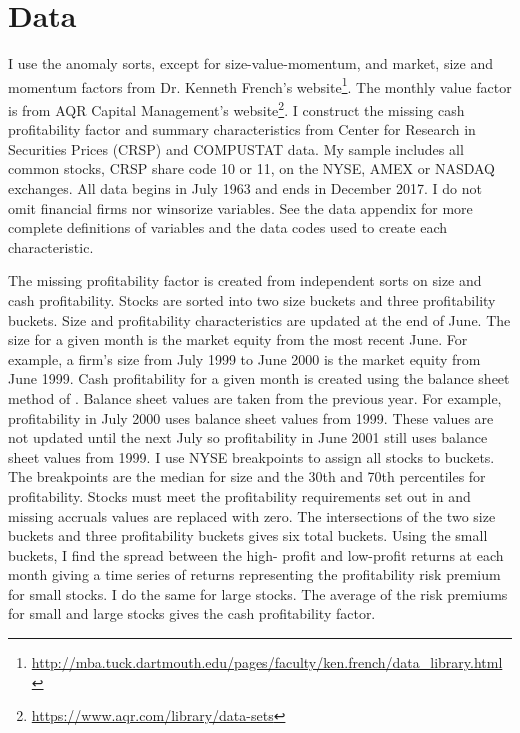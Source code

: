 
\section*{Data}

I use the anomaly sorts, except for size-value-momentum, and market, size and
momentum factors from Dr. Kenneth French's website\footnote{
\url{http://mba.tuck.dartmouth.edu/pages/faculty/ken.french/data_library.html}
}. The monthly value factor is from AQR Capital Management's website\footnote{
\url{https://www.aqr.com/library/data-sets}
}.
I construct the missing cash profitability factor and summary characteristics
from Center for Research in Securities Prices (CRSP) and COMPUSTAT data. My
sample includes all common stocks, CRSP share code 10 or 11, on the NYSE, AMEX
or NASDAQ exchanges. All data begins in July 1963 and ends in December 2017. I
do not omit financial firms nor winsorize variables. See the data appendix for
more complete definitions of variables and the data codes used to create each
characteristic.

The missing profitability factor is created from independent sorts on size and
cash profitability. Stocks are sorted into two size buckets and three
profitability buckets. Size and profitability characteristics are updated at
the end of June. The size for a given month is the market equity from the most
recent June. For example, a firm’s size from July 1999 to June 2000 is the
market equity from June 1999. Cash profitability for a given month is created
using the balance sheet method of \textcite{ball2016accruals}. Balance sheet
values are taken from the previous year. For example, profitability in July
2000 uses balance sheet values from 1999. These values are not updated until
the next July so profitability in June 2001 still uses balance sheet values
from 1999. I use NYSE breakpoints to assign all stocks to buckets. The
breakpoints are the median for size and the 30th and 70th percentiles for
profitability. Stocks must meet the profitability requirements set out in
\textcite{fama2015five} and missing accruals values are replaced with zero. The
intersections of the two size buckets and three profitability buckets gives six
total buckets. Using the small buckets, I find the spread between the high-
profit and low-profit returns at each month giving a time series of returns
representing the profitability risk premium for small stocks. I do the same for
large stocks. The average of the risk premiums for small and large stocks gives
the cash profitability factor.

